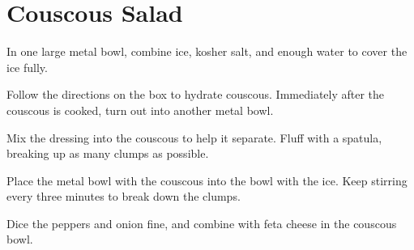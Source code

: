 

\section{Couscous Salad}
\begin{recipe}



In one large metal bowl, combine ice, kosher salt, and enough water to cover the ice fully.


Follow the directions on the box to hydrate couscous. Immediately after the couscous is cooked, turn out into another metal bowl.

\columnbreak


Mix the dressing into the couscous to help it separate. Fluff with a spatula, breaking up as many clumps as possible.

Place the metal bowl with the couscous into the bowl with the ice. Keep stirring every three minutes to break down the clumps.


Dice the peppers and onion fine, and combine with feta cheese in the couscous bowl.



\end{recipe}
